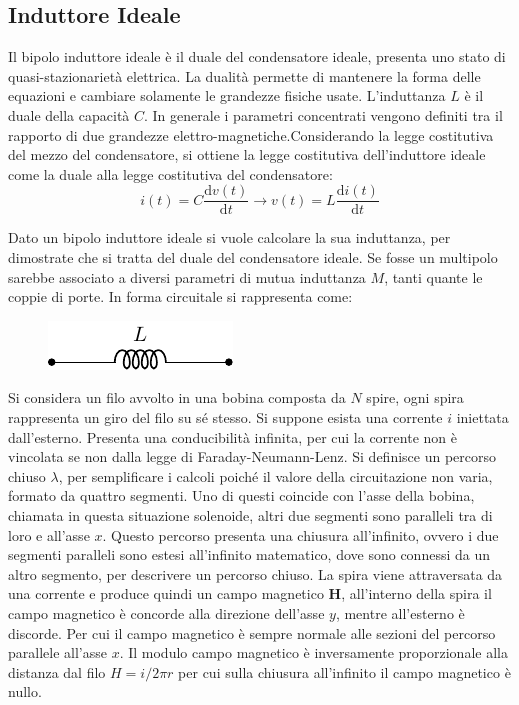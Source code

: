 \documentclass{article}
\newcommand{\vect}[1]{\boldsymbol{\mathbf{#1}}}
\newcommand{\df}{\mathrm{d}}
\numberwithin{equation}{subsection}
\begin{document}
\subsection{Induttore Ideale}
\label{sec:induttore-ideale}
Il bipolo induttore ideale è il duale del condensatore ideale, presenta uno stato di quasi-stazionarietà elettrica. La dualità permette di mantenere la forma delle equazioni 
e cambiare solamente le grandezze fisiche usate. L'induttanza $L$ è il duale della capacità $C$. In generale i parametri concentrati vengono definiti tra il rapporto di due 
grandezze elettro-magnetiche.Considerando la legge costitutiva del mezzo del condensatore, si ottiene la legge costitutiva dell'induttore ideale come la duale alla legge 
costitutiva del condensatore:
\begin{equation*}
    i(t)=\displaystyle C\frac{\df v(t)}{\df t}\to v(t)=L\frac{\df i(t)}{\df t}
\end{equation*}


Dato un bipolo induttore ideale si vuole calcolare la sua induttanza, per dimostrate che si tratta del duale del condensatore ideale. Se fosse un multipolo sarebbe 
associato a diversi parametri di mutua induttanza $M$, tanti quante le coppie di porte. In forma circuitale si rappresenta come:
\begin{figure}[H]%
    \centering
    \includegraphics{induttore.pdf}%
    \label{fig:induttore-forma-circuitale}
\end{figure}
Si considera un filo avvolto in una bobina composta da $N$ spire, ogni spira rappresenta un giro del filo su sé stesso. Si suppone esista una corrente $i$ iniettata dall'esterno. 
Presenta una conducibilità infinita, per cui la corrente non è vincolata se non dalla legge di Faraday-Neumann-Lenz. Si definisce un percorso chiuso $\lambda$, per semplificare 
i calcoli poiché il valore della circuitazione non varia, formato da quattro segmenti. Uno di questi coincide con l'asse della bobina, chiamata in questa situazione solenoide, 
altri due segmenti sono paralleli tra di loro e all'asse $x$. Questo percorso presenta una chiusura all'infinito, ovvero i due segmenti paralleli sono estesi all'infinito 
matematico, dove sono connessi da un altro segmento, per descrivere un percorso chiuso. La spira viene attraversata da una corrente e produce quindi un campo magnetico $\vect{H}$, 
all'interno della spira il campo magnetico è concorde alla direzione dell'asse $y$, mentre all'esterno è discorde. Per cui il campo magnetico è sempre normale alle sezioni del 
percorso parallele all'asse $x$. Il modulo campo magnetico è inversamente proporzionale alla distanza dal filo $H={i}/{2\pi r}$ per cui sulla chiusura all'infinito 
il campo magnetico è nullo. 
\end{document}
